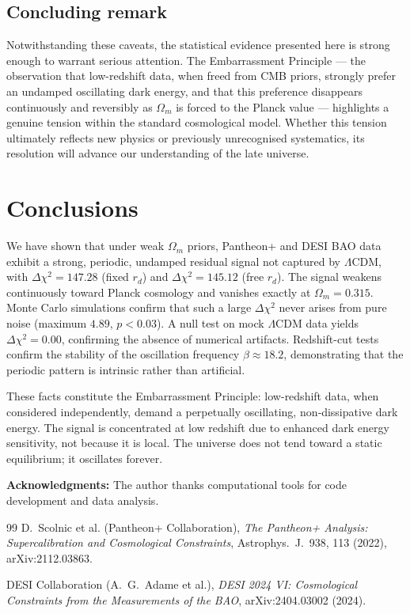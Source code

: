 \documentclass[10pt,a4paper,twocolumn]{article}
\begin{document}
\subsection{Concluding remark}
Notwithstanding these caveats, the statistical evidence presented here is strong enough to warrant serious attention. The Embarrassment Principle — the observation that low-redshift data, when freed from CMB priors, strongly prefer an undamped oscillating dark energy, and that this preference disappears continuously and reversibly as $\Omega_m$ is forced to the Planck value — highlights a genuine tension within the standard cosmological model. Whether this tension ultimately reflects new physics or previously unrecognised systematics, its resolution will advance our understanding of the late universe.

\section{Conclusions}
We have shown that under weak $\Omega_m$ priors, Pantheon+ and DESI BAO data exhibit a strong, periodic, undamped residual signal not captured by $\Lambda$CDM, with $\Delta\chi^2=147.28$ (fixed $r_d$) and $\Delta\chi^2=145.12$ (free $r_d$). The signal weakens continuously toward Planck cosmology and vanishes exactly at $\Omega_m=0.315$. Monte Carlo simulations confirm that such a large $\Delta\chi^2$ never arises from pure noise (maximum $4.89$, $p<0.03$). A null test on mock $\Lambda$CDM data yields $\Delta\chi^2=0.00$, confirming the absence of numerical artifacts. Redshift-cut tests confirm the stability of the oscillation frequency $\beta\approx18.2$, demonstrating that the periodic pattern is intrinsic rather than artificial.

These facts constitute the Embarrassment Principle: low-redshift data, when considered independently, demand a perpetually oscillating, non‑dissipative dark energy. The signal is concentrated at low redshift due to enhanced dark energy sensitivity, not because it is local. The universe does not tend toward a static equilibrium; it oscillates forever.

\vspace{1em}
\textbf{Acknowledgments:} The author thanks computational tools for code development and data analysis.


\begin{thebibliography}{99}
D.~Scolnic et al. (Pantheon+ Collaboration),
\emph{The Pantheon+ Analysis: Supercalibration and Cosmological Constraints},
Astrophys.~J.~938, 113 (2022), arXiv:2112.03863.

DESI Collaboration (A.~G.~Adame et al.),
\emph{DESI 2024 VI: Cosmological Constraints from the Measurements of the BAO},
arXiv:2404.03002 (2024).
\end{thebibliography}
\end{document}
